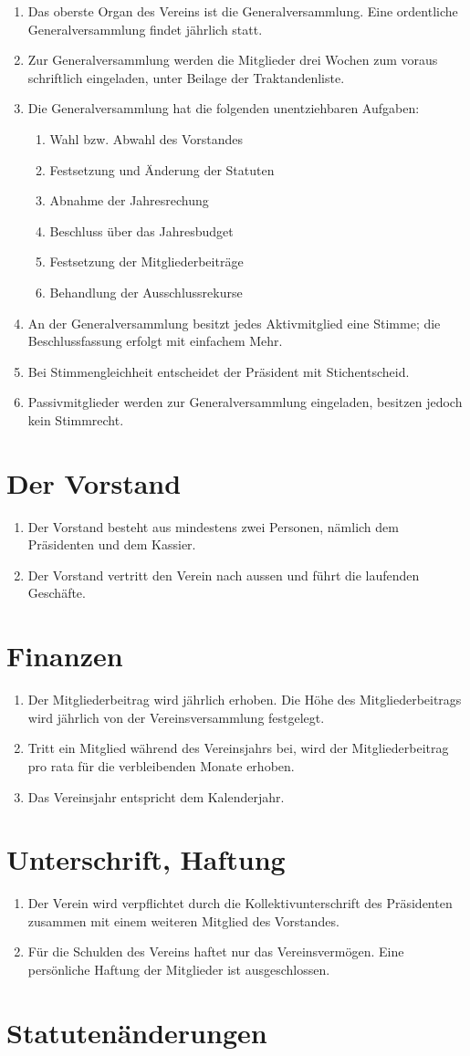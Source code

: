 \documentclass[10pt,a4paper,parskip,fleqn]{scrartcl}
\newcommand{\ol}{\begin{enumerate}[itemsep=-0.2em,topsep=-0.2em]}
\newcommand{\lo}{\end{enumerate}}
\newcommand{\li}{\item}
\begin{document}
\ol
	\li Das oberste Organ des Vereins ist die Generalversammlung. Eine ordentliche
	Generalversammlung findet jährlich statt.
	\li Zur Generalversammlung werden die Mitglieder drei Wochen zum voraus
	schriftlich eingeladen, unter Beilage der Traktandenliste.
	\li Die Generalversammlung hat die folgenden unentziehbaren Aufgaben:
		\ol
			\li Wahl bzw. Abwahl des Vorstandes
			\li Festsetzung und Änderung der Statuten
			\li Abnahme der Jahresrechung
			\li Beschluss über das Jahresbudget
			\li Festsetzung der Mitgliederbeiträge
			\li Behandlung der Ausschlussrekurse
		\lo
	\li An der Generalversammlung besitzt jedes Aktivmitglied eine Stimme; die
	Beschlussfassung erfolgt mit einfachem Mehr.
	\li Bei Stimmengleichheit entscheidet der Präsident mit Stichentscheid.
	\li Passivmitglieder werden zur Generalversammlung eingeladen, besitzen jedoch
	kein Stimmrecht.
\lo


\section{Der Vorstand}

\ol
	\li Der Vorstand besteht aus mindestens zwei Personen, nämlich dem Präsidenten
	und dem Kassier.
	\li Der Vorstand vertritt den Verein nach aussen und führt die laufenden
	Geschäfte.
\lo


\section{Finanzen}

\ol
	\li Der Mitgliederbeitrag wird jährlich erhoben. Die Höhe des
	Mitgliederbeitrags wird jährlich von der Vereinsversammlung festgelegt.
	\li Tritt ein Mitglied während des Vereinsjahrs bei, wird der
	Mitgliederbeitrag pro rata für die verbleibenden Monate erhoben.
	\li Das Vereinsjahr entspricht dem Kalenderjahr.
\lo


\section{Unterschrift, Haftung}

\ol
	\li Der Verein wird verpflichtet durch die Kollektivunterschrift des
	Präsidenten zusammen mit einem weiteren Mitglied des Vorstandes.
	\li Für die Schulden des Vereins haftet nur das Vereinsvermögen. Eine
	persönliche Haftung der Mitglieder ist ausgeschlossen.
\lo


\section{Statutenänderungen}
\end{document}
